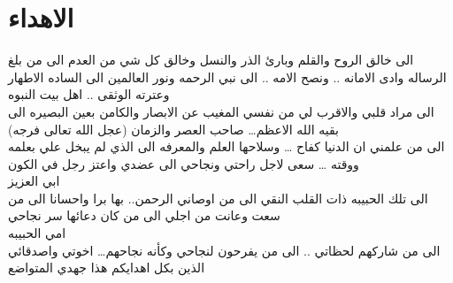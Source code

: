 \chapter*{الاهداء}
\begin{center}
	الى خالق الروح والقلم وبارئ الذر والنسل وخالق كل شي من العدم الى من بلغ الرساله وادى الامانه .. ونصح الامه .. الى نبي الرحمه ونور العالمين الى الساده الاطهار وعترته الوثقى .. اهل بيت النبوه\\[10pt]
الى مراد قلبي والاقرب لي من نفسي المغيب عن الابصار والكامن بعين البصيره الى بقيه الله الاعظم… صاحب العصر والزمان (عجل الله تعالى فرجه)\\[10pt]
الى من علمني ان الدنيا كفاح … وسلاحها العلم والمعرفه الى الذي لم يبخل علي بعلمه ووقته … سعى لاجل راحتي ونجاحي الى عضدي واعتز رجل في الكون\\
 ابي العزيز\\[10pt]
الى تلك الحبيبه ذات القلب النقي الى من اوصاني الرحمن.. بها برا واحسانا الى من سعت وعانت من اجلي الى من كان دعائها سر نجاحي \\
 امي الحبيبه\\[10pt]
الى من شاركهم لحظاتي .. الى من يفرحون لنجاحي وكأنه نجاحهم… اخوتي واصدقائي الذين بكل اهدايكم هذا جهدي المتواضع
\end{center}



